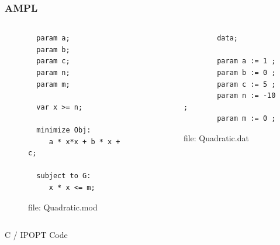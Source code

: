 \documentclass[presentation]{beamer}
\begin{document}
\begin{frame}[fragile]
  \frametitle{AMPL}
  \begin{columns}
    \begin{column}{0.5\textwidth}
      \begin{figure}
\begin{lstlisting}
  param a;
  param b;
  param c;
  param n;
  param m;

  var x >= n;

  minimize Obj:
     a * x*x + b * x + c;

  subject to G:
     x * x <= m;
   \end{lstlisting}
   \caption{file: Quadratic.mod}
   \end{figure}
    \end{column}
    \begin{column}{0.5\textwidth}
      \begin{figure}
      \begin{lstlisting}
        data;

        param a := 1 ;
        param b := 0 ;
        param c := 5 ;
        param n := -10 ;
        param m := 0 ;
      \end{lstlisting}
      \caption{file: Quadratic.dat}
      \end{figure}
    \end{column}
   \end{columns}
\end{frame}

\begin{frame}[label={sec:org07fda49}]{C / IPOPT Code}
\end{frame}
\end{document}
